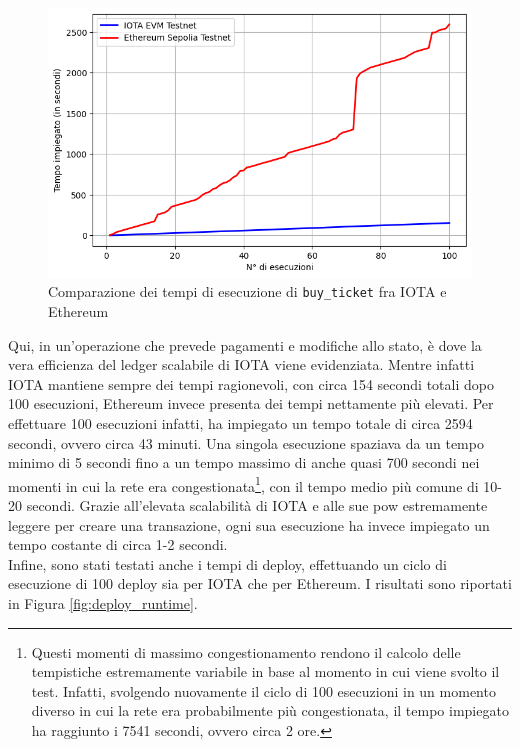 \documentclass[12pt,a4paper,openright,twoside]{report}
\begin{document}
\begin{figure}[h]
\begin{center}
\includegraphics[width=\textwidth]{figures/my_buy_ticket_runtime.png}
\caption[Tempi di esecuzione write]{Comparazione dei tempi di esecuzione di \texttt{buy\_ticket} fra IOTA e Ethereum}\label{fig:buy_ticket_runtime}
\end{center}
\end{figure}
Qui, in un'operazione che prevede pagamenti e modifiche allo stato, è dove la vera efficienza del ledger scalabile di IOTA viene evidenziata. Mentre infatti IOTA mantiene sempre dei tempi ragionevoli, con circa 154 secondi totali dopo 100 esecuzioni, Ethereum invece presenta dei tempi nettamente più elevati. Per effettuare 100 esecuzioni infatti, ha impiegato un tempo totale di circa 2594 secondi, ovvero circa 43 minuti. Una singola esecuzione spaziava da un tempo minimo di 5 secondi fino a un tempo massimo di anche quasi 700 secondi nei momenti in cui la rete era congestionata\footnote{Questi momenti di massimo congestionamento rendono il calcolo delle tempistiche estremamente variabile in base al momento in cui viene svolto il test. Infatti, svolgendo nuovamente il ciclo di 100 esecuzioni in un momento diverso in cui la rete era probabilmente più congestionata, il tempo impiegato ha raggiunto i 7541 secondi, ovvero circa 2 ore.}, con il tempo medio più comune di 10-20 secondi. Grazie all'elevata scalabilità di IOTA e alle sue \acrshort{pow} estremamente leggere per creare una transazione, ogni sua esecuzione ha invece impiegato un tempo costante di circa 1-2 secondi.\\
Infine, sono stati testati anche i tempi di deploy, effettuando un ciclo di esecuzione di 100 deploy sia per IOTA che per Ethereum. I risultati sono riportati in Figura \ref{fig:deploy_runtime}.
\end{document}
